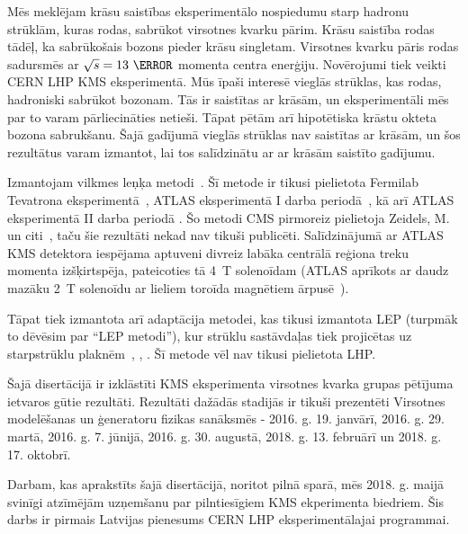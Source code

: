 Mēs meklējam krāsu saistības eksperimentālo nospiedumu starp hadronu \gls{strūklām}, kuras rodas, sabrūkot \gls{virsotnes kvarku} pārim. Krāsu saistība rodas tādēļ, ka sabrūkošais \PW bozons pieder krāsu \gls{singletam}. Virsotnes kvarku pāris rodas \Pp\Pp sadursmēs ar $\sqrt{s}=13~\TeV$ momenta centra enerģiju. Novērojumi tiek veikti CERN \gls{LHP} \gls{KMS} eksperimentā. Mūs īpaši interesē vieglās strūklas, kas rodas, hadroniski sabrūkot \PW bozonam. Tās ir saistītas ar krāsām, un eksperimentāli mēs par to varam pārliecināties netieši. Tāpat pētām arī hipotētiska krāstu okteta \PW bozona sabrukšanu. Šajā gadījumā vieglās strūklas nav saistītas ar krāsām, un šos rezultātus varam izmantot, lai tos salīdzinātu ar ar krāsām saistīto gadījumu.  

Izmantojam vilkmes leņķa metodi~\cite{Gallicchio:2010sw}. Šī metode ir tikusi pielietota Fermilab Tevatrona \DZERO eksperimentā~\cite{Abazov:2011vh}, ATLAS eksperimentā I darba periodā~\cite{Aad:2015lxa}, kā arī ATLAS eksperimentā II darba periodā \cite{Aaboud:2018ibj}. Šo metodi CMS pirmoreiz pielietoja Zeidels, M. un citi~\cite{indico:Markus_cf}, taču šie rezultāti nekad nav tikuši publicēti. Salīdzinājumā ar ATLAS KMS detektora iespējama aptuveni divreiz labāka centrālā reģiona treku momenta izšķirtspēja, pateicoties tā 4~T solenoīdam (ATLAS aprīkots ar daudz mazāku 2~T solenoīdu ar lieliem toroīda magnētiem ārpusē~\cite{Aad:2008zzm}).

Tāpat tiek izmantota arī adaptācija metodei, kas tikusi izmantota LEP (turpmāk to dēvēsim par ``LEP metodi''), kur strūklu sastāvdaļas tiek projicētas uz starpstrūklu plaknēm~\cite{Abbiendi:2005es}, \cite{Abdallah:2006uq}, \cite{Achard:2003pe}. Šī metode vēl nav tikusi pielietota LHP.

Šajā disertācijā ir izklāstīti KMS eksperimenta virsotnes kvarka grupas pētījuma ietvaros gūtie rezultāti. Rezultāti dažādās stadijās ir tikuši prezentēti Virsotnes modelēšanas un ģeneratoru fizikas sanāksmēs - 2016. g. 19. janvārī, 2016. g. 29. martā, 2016. g. 7. jūnijā, 2016. g. 30. augustā, 2018. g. 13. februārī un 2018. g. 17. oktobrī.

Darbam, kas aprakstīts šajā disertācijā, noritot pilnā sparā, mēs 2018. g. maijā svinīgi atzīmējām uzņemšanu par pilntiesīgiem KMS ekperimenta biedriem. Šis darbs ir pirmais Latvijas pienesums CERN LHP eksperimentālajai programmai.
